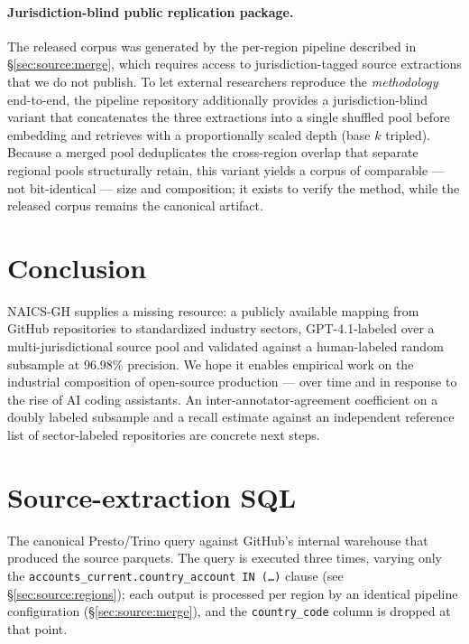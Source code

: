 \documentclass{article}
\begin{document}
\paragraph{Jurisdiction-blind public replication package.}
The released corpus was generated by the per-region pipeline described
in \S\ref{sec:source:merge}, which requires access to
jurisdiction-tagged source extractions that we do not publish. To let
external researchers reproduce the \emph{methodology} end-to-end, the
pipeline repository additionally provides a jurisdiction-blind variant
that concatenates the three extractions into a single shuffled pool
before embedding and retrieves with a proportionally scaled depth
(base $k$ tripled). Because a merged pool deduplicates the
cross-region overlap that separate regional pools structurally retain,
this variant yields a corpus of comparable --- not bit-identical ---
size and composition; it exists to verify the method, while the
released corpus remains the canonical artifact.

\section{Conclusion}
\label{sec:conclusion}

NAICS-GH supplies a missing resource: a publicly available mapping
from GitHub repositories to standardized industry sectors,
GPT-4.1-labeled over a multi-jurisdictional source pool and validated
against a human-labeled random subsample at 96.98\% precision. We
hope it enables empirical work on the industrial composition of
open-source production --- over time and in response to the rise of
AI coding assistants. An inter-annotator-agreement coefficient on a
doubly labeled subsample and a recall estimate against an independent
reference list of sector-labeled repositories are concrete next
steps.




\appendix

\section{Source-extraction SQL}
\label{app:sql}

The canonical Presto/Trino query against GitHub's internal warehouse
that produced the source parquets. The query is executed three times,
varying only the \texttt{accounts\_current.country\_account IN (\dots)}
clause (see \S\ref{sec:source:regions}); each output is processed
per region by an identical pipeline configuration
(\S\ref{sec:source:merge}), and the \texttt{country\_code} column is
dropped at that
point.
\end{document}
